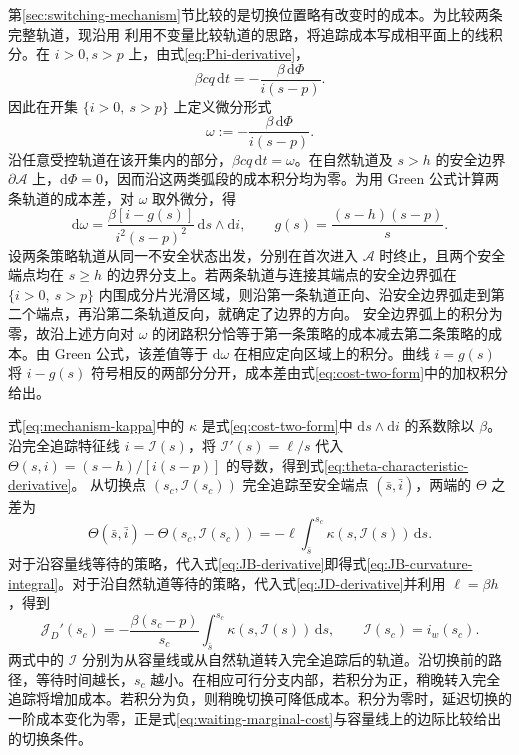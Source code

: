 \documentclass[lang=cn,a4paper,newtx]{elegantpaper}
\theoremstyle{plain}
\theoremstyle{definition}
\newcommand{\Acal}{\mathcal A}
\newcommand{\dd}{\,\mathrm d}
\begin{document}
第\ref{sec:switching-mechanism}节比较的是切换位置略有改变时的成本。为比较两条完整轨道，现沿用 \textcite{Angulo2021} 利用不变量比较轨道的思路，将追踪成本写成相平面上的线积分。在 $i>0,s>p$ 上，由式\eqref{eq:Phi-derivative}，
\begin{equation}
 \beta cq\dd t=-\frac{\beta\,\mathrm d\Phi}{i(s-p)}.
 \label{eq:cost-in-Phi}
\end{equation}
因此在开集 $\{i>0,\ s>p\}$ 上定义微分形式
\begin{equation}
 \omega:=-\frac{\beta\,\mathrm d\Phi}{i(s-p)}.
 \label{eq:cost-one-form}
\end{equation}
沿任意受控轨道在该开集内的部分，$\beta cq\dd t=\omega$。在自然轨道及 $s>h$ 的安全边界 $\partial\Acal$ 上，$\mathrm d\Phi=0$，因而沿这两类弧段的成本积分均为零。为用 Green 公式计算两条轨道的成本差，对 $\omega$ 取外微分，得
\begin{equation}
 \mathrm d\omega
 =\frac{\beta[i-g(s)]}{i^2(s-p)^2}\,\mathrm ds\wedge\mathrm di,
 \qquad g(s)=\frac{(s-h)(s-p)}s.
 \label{eq:cost-two-form}
\end{equation}
设两条策略轨道从同一不安全状态出发，分别在首次进入 $\Acal$ 时终止，且两个安全端点均在 $s\ge h$ 的边界分支上。若两条轨道与连接其端点的安全边界弧在 $\{i>0,\ s>p\}$ 内围成分片光滑区域，则沿第一条轨道正向、沿安全边界弧走到第二个端点，再沿第二条轨道反向，就确定了边界的方向。
安全边界弧上的积分为零，故沿上述方向对 $\omega$ 的闭路积分恰等于第一条策略的成本减去第二条策略的成本。由 Green 公式，该差值等于 $\mathrm d\omega$ 在相应定向区域上的积分。曲线 $i=g(s)$ 将 $i-g(s)$ 符号相反的两部分分开，成本差由式\eqref{eq:cost-two-form}中的加权积分给出。

式\eqref{eq:mechanism-kappa}中的 $\kappa$ 是式\eqref{eq:cost-two-form}中 $\mathrm ds\wedge\mathrm di$ 的系数除以 $\beta$。沿完全追踪特征线 $i=\mathcal I(s)$，将 $\mathcal I'(s)=\ell/s$ 代入 $\Theta(s,i)=(s-h)/[i(s-p)]$ 的导数，得到式\eqref{eq:theta-characteristic-derivative}。
从切换点 $(s_c,\mathcal I(s_c))$ 完全追踪至安全端点 $(\bar s,\bar i)$，两端的 $\Theta$ 之差为
\[
\Theta(\bar s,\bar i)-\Theta(s_c,\mathcal I(s_c))
=-\ell\int_{\bar s}^{s_c}\kappa(s,\mathcal I(s))\dd s.
\]
对于沿容量线等待的策略，代入式\eqref{eq:JB-derivative}即得式\eqref{eq:JB-curvature-integral}。对于沿自然轨道等待的策略，代入式\eqref{eq:JD-derivative}并利用 $\ell=\beta h$，得到
\begin{equation}
 \mathcal J_D'(s_c)
 =-\frac{\beta(s_c-p)}{s_c}
   \int_{\bar s}^{s_c}\kappa(s,\mathcal I(s))\dd s,
 \qquad \mathcal I(s_c)=i_w(s_c).
 \label{eq:JD-curvature-integral}
\end{equation}
两式中的 $\mathcal I$ 分别为从容量线或从自然轨道转入完全追踪后的轨道。沿切换前的路径，等待时间越长，$s_c$ 越小。在相应可行分支内部，若积分为正，稍晚转入完全追踪将增加成本。若积分为负，则稍晚切换可降低成本。积分为零时，延迟切换的一阶成本变化为零，正是式\eqref{eq:waiting-marginal-cost}与容量线上的边际比较给出的切换条件。
\end{document}

